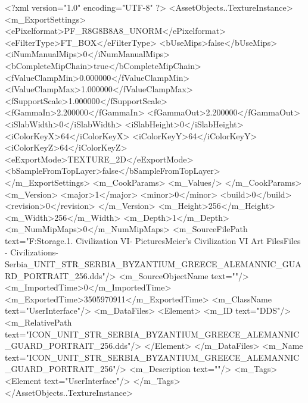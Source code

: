 <?xml version="1.0" encoding="UTF-8" ?>
<AssetObjects..TextureInstance>
	<m_ExportSettings>
		<ePixelformat>PF_R8G8B8A8_UNORM</ePixelformat>
		<eFilterType>FT_BOX</eFilterType>
		<bUseMips>false</bUseMips>
		<iNumManualMips>0</iNumManualMips>
		<bCompleteMipChain>true</bCompleteMipChain>
		<fValueClampMin>0.000000</fValueClampMin>
		<fValueClampMax>1.000000</fValueClampMax>
		<fSupportScale>1.000000</fSupportScale>
		<fGammaIn>2.200000</fGammaIn>
		<fGammaOut>2.200000</fGammaOut>
		<iSlabWidth>0</iSlabWidth>
		<iSlabHeight>0</iSlabHeight>
		<iColorKeyX>64</iColorKeyX>
		<iColorKeyY>64</iColorKeyY>
		<iColorKeyZ>64</iColorKeyZ>
		<eExportMode>TEXTURE_2D</eExportMode>
		<bSampleFromTopLayer>false</bSampleFromTopLayer>
	</m_ExportSettings>
	<m_CookParams>
		<m_Values/>
	</m_CookParams>
	<m_Version>
		<major>1</major>
		<minor>0</minor>
		<build>0</build>
		<revision>0</revision>
	</m_Version>
	<m_Height>256</m_Height>
	<m_Width>256</m_Width>
	<m_Depth>1</m_Depth>
	<m_NumMipMaps>0</m_NumMipMaps>
	<m_SourceFilePath text="F:\Mod Storage\2.1. Civilization VI\Mods\Archive - Pictures\Sid Meier's Civilization VI Art Files\Art Files - Civilizations\Civilization - Serbia\ICON_UNIT_STR_SERBIA_BYZANTIUM_GREECE_ALEMANNIC_GUARD_PORTRAIT_256.dds"/>
	<m_SourceObjectName text=""/>
	<m_ImportedTime>0</m_ImportedTime>
	<m_ExportedTime>3505970911</m_ExportedTime>
	<m_ClassName text="UserInterface"/>
	<m_DataFiles>
		<Element>
			<m_ID text="DDS"/>
			<m_RelativePath text="ICON_UNIT_STR_SERBIA_BYZANTIUM_GREECE_ALEMANNIC_GUARD_PORTRAIT_256.dds"/>
		</Element>
	</m_DataFiles>
	<m_Name text="ICON_UNIT_STR_SERBIA_BYZANTIUM_GREECE_ALEMANNIC_GUARD_PORTRAIT_256"/>
	<m_Description text=""/>
	<m_Tags>
		<Element text="UserInterface"/>
	</m_Tags>
</AssetObjects..TextureInstance>

